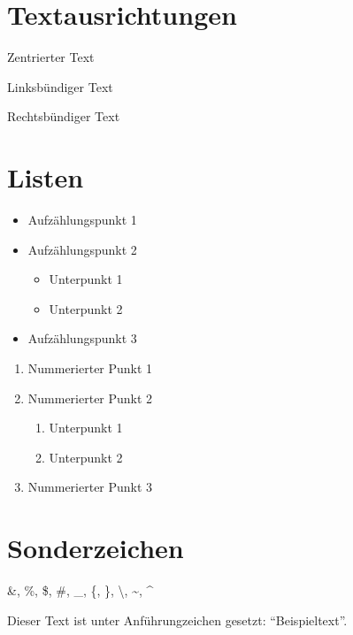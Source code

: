 \section{Textausrichtungen}
\begin{center}
    Zentrierter Text
\end{center}

\begin{flushleft}
    Linksbündiger Text
\end{flushleft}

\begin{flushright}
    Rechtsbündiger Text
\end{flushright}

\section{Listen}
\begin{itemize}
    \item Aufzählungspunkt 1
    \item Aufzählungspunkt 2
    \begin{itemize}
        \item Unterpunkt 1
        \item Unterpunkt 2
    \end{itemize}
    \item Aufzählungspunkt 3
\end{itemize}

\begin{enumerate}
    \item Nummerierter Punkt 1
    \item Nummerierter Punkt 2
    \begin{enumerate}
        \item Unterpunkt 1
        \item Unterpunkt 2
    \end{enumerate}
    \item Nummerierter Punkt 3
\end{enumerate}

\section{Sonderzeichen}
\&, \%, \$, \#, \_, \{, \}, \textbackslash, \textasciitilde, \textasciicircum

Dieser Text ist unter Anführungzeichen gesetzt: ``Beispieltext''. \\

